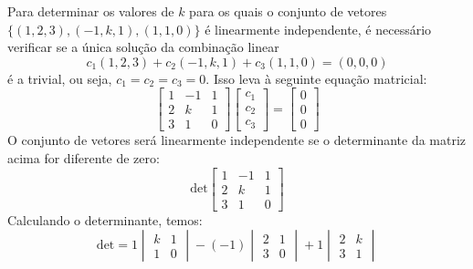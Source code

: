 \begin{resolution}
  Para determinar os valores de \( k \) para os quais o conjunto de vetores \( \{(1, 2, 3), (-1, k, 1), (1, 1, 0)\} \) é linearmente independente, é necessário verificar se a única solução da combinação linear
  \begin{equation}
    c_1(1, 2, 3) + c_2(-1, k, 1) + c_3(1, 1, 0) = (0, 0, 0)
  \end{equation}
  é a trivial, ou seja, \( c_1 = c_2 = c_3 = 0 \). Isso leva à seguinte equação matricial:
  \begin{equation}
    \begin{bmatrix}
      1 & -1 & 1 \\
      2 & k  & 1 \\
      3 & 1  & 0
    \end{bmatrix}
    \begin{bmatrix}
      c_1 \\
      c_2 \\
      c_3
    \end{bmatrix}
    =
    \begin{bmatrix}
      0 \\
      0 \\
      0
    \end{bmatrix}
  \end{equation}
  O conjunto de vetores será linearmente independente se o determinante da matriz acima for diferente de zero:
  \begin{equation}
    \text{det} \begin{bmatrix}
      1 & -1 & 1 \\
      2 & k  & 1 \\
      3 & 1  & 0
    \end{bmatrix}
  \end{equation}
  Calculando o determinante, temos:
  \begin{equation}
    \text{det} = 1 \begin{vmatrix}
      k & 1 \\
      1 & 0
    \end{vmatrix} - (-1) \begin{vmatrix}
      2 & 1 \\
      3 & 0
    \end{vmatrix} + 1 \begin{vmatrix}
      2 & k \\
      3 & 1
    \end{vmatrix}
  \end{equation}


\end{resolution}
